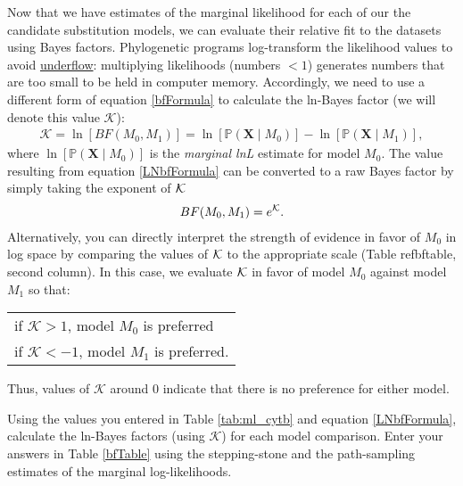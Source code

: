Now that we have estimates of the marginal likelihood for each of our the candidate substitution models, we can evaluate their relative fit to the datasets using Bayes factors.
Phylogenetic programs log-transform the likelihood values to avoid \href{http://en.wikipedia.org/wiki/Arithmetic_underflow}{underflow}: multiplying likelihoods (numbers $< 1$) generates numbers that are too small to be held in computer memory.
Accordingly, we need to use a different form of equation \ref{bfFormula} to calculate the ln-Bayes factor (we will denote this value $\mathcal{K}$):
\begin{align}\label{LNbfFormula}
\mathcal{K}=\ln[BF(M_0,M_1)] = \ln[\mathbb{P}(\mathbf X \mid M_0)]-\ln[\mathbb{P}(\mathbf X \mid M_1)],
\end{align}
where $\ln[\mathbb{P}(\mathbf X \mid M_0)]$ is the \textit{marginal lnL} estimate for model $M_0$. 
The value resulting from equation \ref{LNbfFormula} can be converted to a raw Bayes factor by simply taking the exponent of $\cal{K}$
\begin{align}\label{LNbfFormula2}
BF(M_0,M_1) = e^{\cal{K}}.
\end{align}
Alternatively, you can directly interpret the strength of evidence in favor of $M_0$ in log space by comparing the values of $\cal{K}$ to the appropriate scale (Table ref{bftable}, second column).
In this case, we evaluate $\cal{K}$ in favor of model $M_0$ against model $M_1$ so that:
\begin{center}
\begin{tabular}{l}
if $\mathcal{K} > 1$, model $M_0$ is preferred\\
if $\mathcal{K} < -1$, model $M_1$ is preferred.
\end{tabular}
\end{center}
Thus, values of $\mathcal{K}$ around 0 indicate that there is no preference for either model. 

Using the values you entered in Table \ref{tab:ml_cytb} and equation \ref{LNbfFormula}, calculate the ln-Bayes factors (using $\mathcal{K}$) for each model comparison. 
Enter your answers in Table \ref{bfTable} using the stepping-stone and the path-sampling estimates of the marginal log-likelihoods. 

